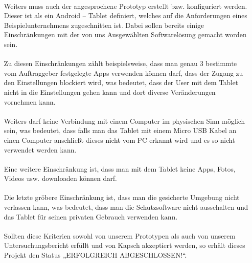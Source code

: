 \paragraph*{}
Weiters muss auch der angesprochene Prototyp erstellt bzw. konfiguriert werden. Dieser ist als ein Android – Tablet definiert, welches auf  die Anforderungen eines Beispielunternehmens zugeschnitten ist. Dabei sollen bereits einige Einschränkungen mit der von uns Ausgewählten Softwarelösung gemacht worden sein.
\paragraph*{}
Zu diesen Einschränkungen zählt beispielsweise, dass man genau 3 bestimmte vom Auftraggeber festgelegte Apps verwenden können darf, dass der Zugang zu den Einstellungen blockiert wird, was bedeutet, dass der User mit dem Tablet nicht in die Einstellungen gehen kann und dort diverse Veränderungen vornehmen kann.
\paragraph*{}
Weiters darf keine Verbindung mit einem Computer im physischen Sinn möglich sein, was bedeutet, dass falls man das Tablet mit einem Micro USB Kabel an einen Computer anschließt dieses nicht vom PC erkannt wird und es so nicht verwendet werden kann.
\paragraph*{}
Eine weitere Einschränkung ist, dass man mit dem Tablet keine Apps, Fotos, Videos usw. downloaden können darf.
\paragraph*{}
Die letzte gröbere Einschränkung ist, dass man die gesicherte Umgebung nicht verlassen kann, was bedeutet, dass man die Schutzsoftware nicht ausschalten und das Tablet für seinen privaten Gebrauch verwenden kann.
\paragraph*{}
Sollten diese Kriterien sowohl von unserem Prototypen als auch von unserem Untersuchungsbericht erfüllt und von Kapsch akzeptiert werden, so erhält dieses Projekt den Status „ERFOLGREICH ABGESCHLOSSEN!“. 
